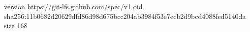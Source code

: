 version https://git-lfs.github.com/spec/v1
oid sha256:11b0682d20629dfd86d98d675bcc204ab3984f53e7ecb2d9bcd4088fed5140da
size 168
